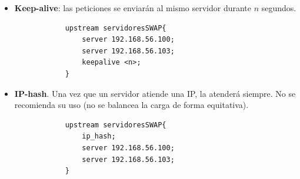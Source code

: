 \documentclass[12pt,spanish]{article}
\begin{document}
\begin{enumerate}
\begin{itemize}
			\item \textbf{Keep-alive}: las peticiones se enviarán al mismo servidor durante $n$ segundos.
			\begin{lstlisting}
			upstream servidoresSWAP{
				server 192.168.56.100;
				server 192.168.56.103;
				keepalive <n>;
			}
			\end{lstlisting}
			\item \textbf{IP-hash}. Una vez que un servidor atiende una IP, la atenderá siempre. No se recomienda su uso (no se balancea la carga de forma equitativa).
			\begin{lstlisting}
			upstream servidoresSWAP{
				ip_hash;
				server 192.168.56.100;
				server 192.168.56.103;
			}
			\end{lstlisting}
		\end{itemize}


	\end{enumerate}
\end{document}
